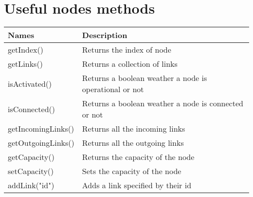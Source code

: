 \documentclass[11pt,fleqn]{book} %
\begin{document}
\section{Useful nodes methods}\label{sec:node_methods}
\begin{table}[!ht]
\centering
\begin{tabular}{| p{7cm} | p{9cm} |}
\hline
\rowcolor{Gray}
Names & Description \\
\hline
getIndex() & Returns the index of node\\
\hline
getLinks() & Returns a collection of links \\
\hline
isActivated() & Returns a boolean weather a node is operational or not \\
\hline
isConnected() & Returns a boolean weather a node is connected or not \\
\hline
getIncomingLinks() & Returns all the incoming links \\
\hline
getOutgoingLinks() & Returns all the outgoing links \\
\hline
getCapacity() & Returns the capacity of the node \\
\hline
setCapacity() & Sets the capacity of the node \\
\hline
addLink({"id"}) & Adds a link specified by their id \\
\hline
\end{tabular}
\end{table}
\end{document}
